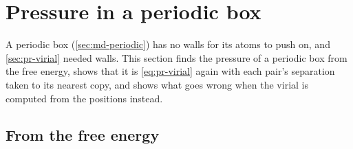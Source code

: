 \section{Pressure in a periodic box}
\label{sec:pr-periodic}

A periodic box (\cref{sec:md-periodic}) has no walls for its atoms to push
on, and \cref{sec:pr-virial} needed walls. This section finds the
pressure of a periodic box from the free energy, shows that it is
\cref{eq:pr-virial} again with each pair's separation taken to its
nearest copy, and shows what goes wrong when the virial is computed from
the positions instead.

\subsection*{From the free energy}

